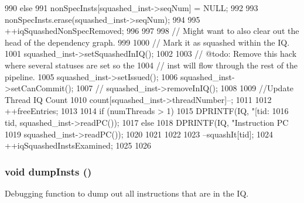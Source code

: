 \begin{DoxyCode}
{{{{990             } else {
991                 nonSpecInsts[squashed_inst->seqNum] = NULL;
992 
993                 nonSpecInsts.erase(squashed_inst->seqNum);
994 
995                 ++iqSquashedNonSpecRemoved;
996             }
997 
998             // Might want to also clear out the head of the dependency graph.
999 
1000             // Mark it as squashed within the IQ.
1001             squashed_inst->setSquashedInIQ();
1002 
1003             // @todo: Remove this hack where several statuses are set so the
1004             // inst will flow through the rest of the pipeline.
1005             squashed_inst->setIssued();
1006             squashed_inst->setCanCommit();
1007 //            squashed_inst->removeInIQ();
1008 
1009             //Update Thread IQ Count
1010             count[squashed_inst->threadNumber]--;
1011 
1012             ++freeEntries;
1013 
1014             if (numThreads > 1) {
1015                 DPRINTF(IQ, "[tid:%
1016                         tid, squashed_inst->readPC());
1017             } else {
1018                 DPRINTF(IQ, "Instruction PC %
1019                         squashed_inst->readPC());
1020             }
1021         }
1022 
1023         --squashIt[tid];
1024         ++iqSquashedInstsExamined;
1025     }
1026 }
\end{DoxyCode}
\hypertarget{classInstQueue_a80587b4fe043bbe1995536cb3b361588}{
\subsubsection[{dumpInsts}]{\setlength{\rightskip}{0pt plus 5cm}void dumpInsts ()}}
\label{classInstQueue_a80587b4fe043bbe1995536cb3b361588}
Debugging function to dump out all instructions that are in the IQ. 


